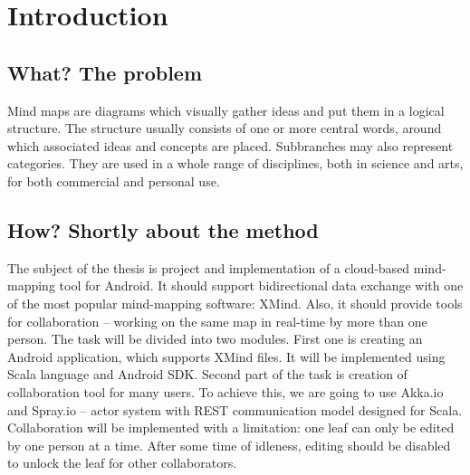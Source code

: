 %
%
%
%
%

\chapter{Introduction}
\label{chap:introduction}

\section{What? The problem}
\label{sec:what}

Mind maps are diagrams which visually gather ideas and put them in a logical structure. The structure usually consists of one or more central words, around which associated ideas and concepts are placed. Subbranches may also represent categories. They are used in a whole range of disciplines, both in science and arts, for both commercial and personal use.

\section{How? Shortly about the method}
\label{sec:how}

The subject of the thesis is project and implementation of a cloud-based mind-mapping tool for Android. It should support bidirectional data exchange with one of the most popular mind-mapping software: XMind. Also, it should provide tools for collaboration -- working on the same map in real-time by more than one person. The task will be divided into two modules. First one is creating an Android application, which supports XMind files. It will be implemented using Scala language and Android SDK. Second part of the task is creation of collaboration tool for many users. To achieve this, we are going to use Akka.io and Spray.io -- actor system with REST communication model designed for Scala. Collaboration will be implemented with a limitation: one leaf can only be edited by one person at a time. After some time of idleness, editing should be disabled to unlock the leaf for other collaborators.

